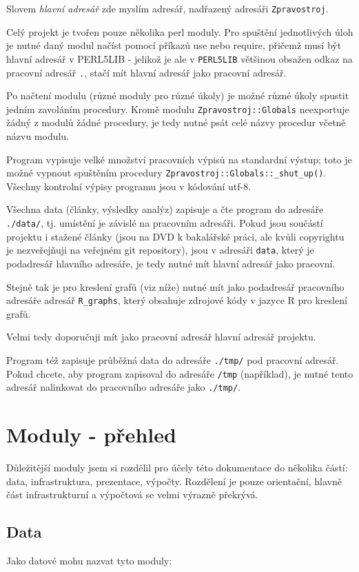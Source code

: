 \documentclass[12pt,a4paper]{report}
\begin{document}
Slovem \emph{hlavní adresář} zde myslím adresář, nadřazený adresáři \texttt{Zpravostroj}.

Celý projekt je tvořen pouze několika perl moduly. Pro spuštění jednotlivých úloh je nutné daný modul načíst pomocí příkazů use nebo require, přičemž musí být hlavní adresář v PERL5LIB - jelikož je ale v \texttt{PERL5LIB} většinou obsažen odkaz na pracovní adresář \texttt{.}, stačí mít hlavní adresář jako pracovní adresář.

Po načtení modulu (různé moduly pro různé úkoly) je možné různé úkoly spustit jedním zavoláním procedury. Kromě modulu \texttt{Zpravostroj::Globals} neexportuje žádný z modulů žádné procedury, je tedy nutné psát celé názvy procedur včetně názvu modulu.

Program vypisuje velké množství pracovních výpisů na standardní výstup; toto je možné vypnout spuštěním procedury \texttt{Zpravostroj::Globals::\_shut\_up()}. Všechny kontrolní výpisy programu jsou v kódování utf-8.

Všechna data (články, výsledky analýz) zapisuje a čte program do adresáře \texttt{./data/}, tj. umístění je závislé na pracovním adresáři. Pokud jsou součástí projektu i stažené články (jsou na DVD k bakalářské práci, ale kvůli copyrightu je nezveřejňuji na veřejném git repository), jsou v adresáři \texttt{data}, který je podadresář hlavního adresáře, je tedy nutné mít hlavní adresář jako pracovní.

Stejně tak je pro kreslení grafů (viz níže) nutné mít jako podadresář pracovního adresáře adresář \texttt{R\_graphs}, který obsahuje zdrojové kódy v jazyce R pro kreslení grafů.

Velmi tedy doporučuji mít jako pracovní adresář hlavní adresář projektu.

Program též zapisuje průběžná data do adresáře \texttt{./tmp/} pod pracovní adresář. Pokud chcete, aby program zapisoval do adresáře \texttt{/tmp} (například), je nutné tento adresář nalinkovat do pracovního adresáře jako \texttt{./tmp/}.

\chapter{Moduly - přehled}

Důležitější moduly jsem si rozdělil pro účely této dokumentace do několika částí: data, infrastruktura, prezentace, výpočty. Rozdělení je pouze orientační, hlavně část infrastrukturní a výpočtová se velmi výrazně překrývá.

\section{Data}
Jako datové mohu nazvat tyto moduly:
\end{document}

